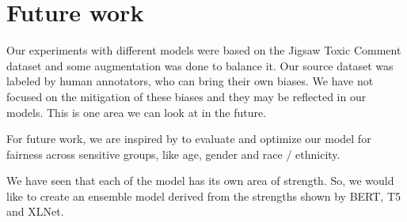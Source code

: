 \documentclass[11pt,a4paper]{article}
\begin{document}
\section{Future work}
Our experiments with different models were based on the Jigsaw Toxic Comment dataset and some augmentation was done to balance it.  Our source dataset was labeled by human annotators, who can bring their own biases.  We have not focused on the mitigation of these biases and they may be reflected in our models.  This is one area we can look at in the future.

For future work, we are inspired by \citet*{baldini2021your} to evaluate and optimize our model for fairness across sensitive groups, like age, gender and race / ethnicity.

We have seen that each of the model has its own area of strength. So, we would like to create an ensemble model derived from the strengths shown by BERT, T5 and XLNet.





\end{document}
